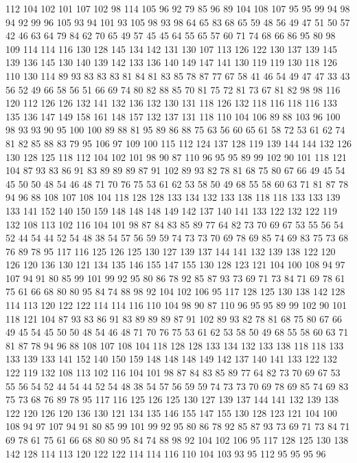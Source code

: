 112 104 102 101 107 102 98 114 105 96 92 79 85 96 89 104 108 107 95 95
99 94 98 94 92 99 96 105 93 94 101 93 105 98 93 98 64 65 83 68
65 59 48 56 49 47 51 50 57 42 46 63 64 79 84 62 70 65 49 57
45 45 64 55 65 57 60 71 74 68 66 86 95 80 98 109 114 114 116 130
128 145 134 142 131 130 107 113 126 122 130 137 139 145 139 136 145 130 140 139
142 133 136 140 149 147 141 130 119 119 130 118 126 110 130 114 89 93 83 83
83 81 84 81 83 85 78 87 77 67 58 41 46 54 49 47 47 33 43 56
52 49 66 58 56 51 66 69 74 80 82 88 85 70 81 75 72 81 73 67
81 82 98 98 116 120 112 126 126 132 141 132 136 132 130 131 118 126 132 118
116 118 116 133 135 136 147 149 158 161 148 157 132 137 131 118 110 104 106 89
88 103 96 100 98 93 93 90 95 100 100 89 88 81 95 89 86 88 75 63
56 60 65 61 58 72 53 61 62 74 81 82 85 88 83 79 95 106 97 109
100 115 112 124 137 128 119 139 144 144 132 126 130 128 125 118 112 104 102 101
98 90 87 110 96 95 95 89 99 102 90 101 118 121 104 87 93 83 86 91
83 89 89 89 87 91 102 89 93 82 78 81 68 75 80 67 66 49 45 54
45 50 50 48 54 46 48 71 70 76 75 53 61 62 53 58 50 49 68 55
58 60 63 71 81 87 78 94 96 88 108 107 108 104 118 128 128 133 134 132
133 138 118 118 133 133 139 133 141 152 140 150 159 148 148 148 149 142 137 140
141 133 122 132 122 119 132 108 113 102 116 104 101 98 87 84 83 85 89 77
64 82 73 70 69 67 53 55 56 54 52 44 54 44 52 54 48 38 54 57
56 59 59 74 73 73 70 69 78 69 85 74 69 83 75 73 68 76 89 78
95 117 116 125 126 125 130 127 139 137 144 141 132 139 138 122 120 126 120 136
130 121 134 135 146 155 147 155 130 128 123 121 104 100 108 94 97 107 94 91
80 85 99 101 99 92 95 80 86 78 92 85 87 93 73 69 71 73 84 71
69 78 61 75 61 66 68 80 80 95 84 74 88 98 92 104 102 106 95 117
128 125 130 138 142 128 114 113 120 122 122 114 114 116 110 104 98 90 87 110
96 95 95 89 99 102 90 101 118 121 104 87 93 83 86 91 83 89 89 89
87 91 102 89 93 82 78 81 68 75 80 67 66 49 45 54 45 50 50 48
54 46 48 71 70 76 75 53 61 62 53 58 50 49 68 55 58 60 63 71
81 87 78 94 96 88 108 107 108 104 118 128 128 133 134 132 133 138 118 118
133 133 139 133 141 152 140 150 159 148 148 148 149 142 137 140 141 133 122 132
122 119 132 108 113 102 116 104 101 98 87 84 83 85 89 77 64 82 73 70
69 67 53 55 56 54 52 44 54 44 52 54 48 38 54 57 56 59 59 74
73 73 70 69 78 69 85 74 69 83 75 73 68 76 89 78 95 117 116 125
126 125 130 127 139 137 144 141 132 139 138 122 120 126 120 136 130 121 134 135
146 155 147 155 130 128 123 121 104 100 108 94 97 107 94 91 80 85 99 101
99 92 95 80 86 78 92 85 87 93 73 69 71 73 84 71 69 78 61 75
61 66 68 80 80 95 84 74 88 98 92 104 102 106 95 117 128 125 130 138
142 128 114 113 120 122 122 114 114 116 110 104 103 93 95 112 95 95 95 96
